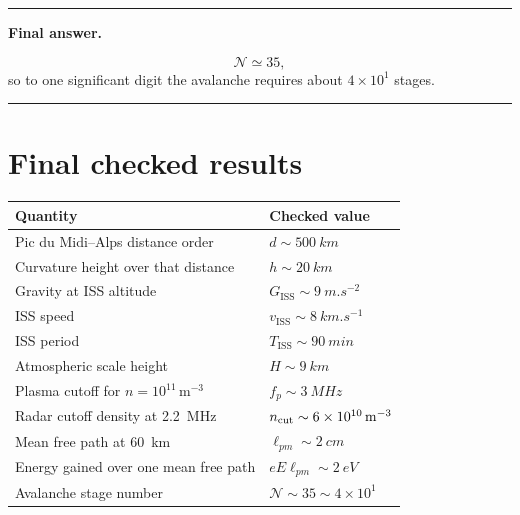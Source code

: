 \documentclass[11pt,a4paper]{article}
\newenvironment{finalanswer}{%
  \begin{center}\begin{minipage}{0.94\linewidth}\hrule\vspace{0.45em}\textbf{Final answer. }%
}{%
  \vspace{0.45em}\hrule\end{minipage}\end{center}%
}
\newcommand{\ISS}{\mathrm{ISS}}
\begin{document}
\begin{finalanswer}
\[
\mathcal{N}\simeq35,
\]
so to one significant digit the avalanche requires about $4\times10^1$ stages.
\end{finalanswer}

\section*{Final checked results}

\begin{center}
\begin{tabular}{@{}ll@{}}
\toprule
Quantity & Checked value \\
\midrule
Pic du Midi--Alps distance order & $d\sim\SI{500}{km}$ \\
Curvature height over that distance & $h\sim\SI{20}{km}$ \\
Gravity at ISS altitude & $G_{\ISS}\sim\SI{9}{m.s^{-2}}$ \\
ISS speed & $v_{\ISS}\sim\SI{8}{km.s^{-1}}$ \\
ISS period & $T_{\ISS}\sim\SI{90}{min}$ \\
Atmospheric scale height & $H\sim\SI{9}{km}$ \\
Plasma cutoff for $n=10^{11}\,\mathrm{m^{-3}}$ & $f_p\sim\SI{3}{MHz}$ \\
Radar cutoff density at \SI{2.2}{MHz} & $n_{\rm cut}\sim\SI{6e10}{m^{-3}}$ \\
Mean free path at \SI{60}{km} & $\ell_{pm}\sim\SI{2}{cm}$ \\
Energy gained over one mean free path & $eE\ell_{pm}\sim\SI{2}{eV}$ \\
Avalanche stage number & $\mathcal{N}\sim35\sim4\times10^1$ \\
\bottomrule
\end{tabular}
\end{center}
\end{document}
